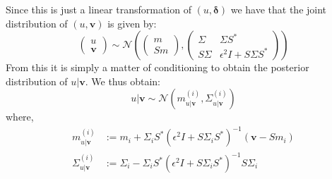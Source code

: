 \documentclass{article}
\theoremstyle{definition}
\theoremstyle{remark}
\begin{document}
Since this is just a linear transformation of $(u,\boldsymbol{\delta})$ we have that the joint distribution of $(u,\mathbf{v})$ is given by:
\begin{equation}
  \label{jointDist}
  \begin{pmatrix}
    u \\
    \mathbf{v}
  \end{pmatrix}\sim\mathcal{N}\left(
                              \begin{pmatrix}
                                m \\
                                Sm
                              \end{pmatrix},
                              \begin{pmatrix}
                                \Sigma & \Sigma S^{*} \\
                                S\Sigma & \epsilon^{2}I+S\Sigma S^{*}
                              \end{pmatrix}
                              \right)
\end{equation}
From this it is simply a matter of conditioning to obtain the posterior distribution of $u|\mathbf{v}$. We thus obtain:
\begin{equation}
  \label{posterior}
  u|\mathbf{v}\sim\mathcal{N}(m^{(i)}_{u|\mathbf{v}},\Sigma^{(i)}_{u|\mathbf{v}})
\end{equation}
where,
\begin{align}
  \label{posterior_mean}
  m^{(i)}_{u|\mathbf{v}}&:=m_i+\Sigma_{i}S^{*}(\epsilon^{2}I+S\Sigma_{i}S^{*})^{-1}(\mathbf{v}-Sm_{i}) \\
  \label{posterior_covariance}
  \Sigma^{(i)}_{u|\mathbf{v}}&:=\Sigma_{i}-\Sigma_{i}S^{*}(\epsilon^{2}I+S\Sigma_{i}S^{*})^{-1}S\Sigma_{i}
\end{align}
\end{document}
